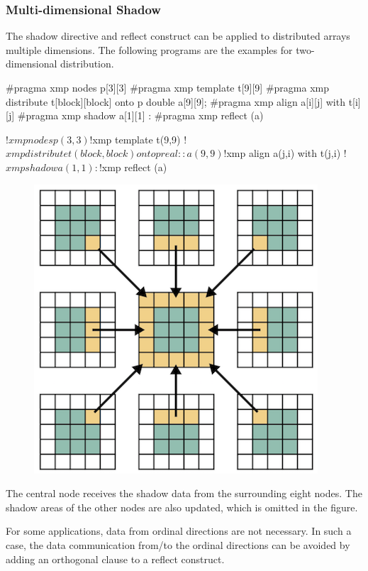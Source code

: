 \subsubsection{Multi-dimensional Shadow}

The shadow directive and reflect construct can be applied to distributed
arrays multiple dimensions. The following programs are the examples for
two-dimensional distribution.

\begin{XCexample}
#pragma xmp nodes p[3][3]
#pragma xmp template t[9][9]
#pragma xmp distribute t[block][block] onto p
double a[9][9];
#pragma xmp align a[i][j] with t[i][j]
#pragma xmp shadow a[1][1]
   :
#pragma xmp reflect (a)
\end{XCexample}

\begin{XFexample}
!$xmp nodes p(3,3)
!$xmp template t(9,9)
!$xmp distribute t(block,block) onto p
real :: a(9,9)
!$xmp align a(j,i) with t(j,i)
!$xmp shadow a(1,1)
   :
!$xmp reflect (a)
\end{XFexample}

\begin{figure}
  \centering
  \includegraphics{figs/multi1.png}
\end{figure}

The central node receives the shadow data from the surrounding eight
nodes. The shadow areas of the other nodes are also updated, which is
omitted in the figure.

For some applications, data from ordinal directions are not
necessary. In such a case, the data communication from/to the ordinal
directions can be avoided by adding an orthogonal clause to a reflect
construct.

